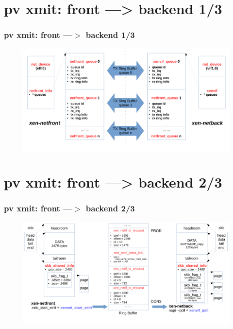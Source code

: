 \documentclass[aspectratio=169]{beamer}
\begin{document}

\section{pv xmit: front ---> backend 1/3}
\begin{frame}
\frametitle{pv xmit: front ---$>$ backend 1/3}
\begin{figure}
\includegraphics[width=1.0\linewidth]{figures/eth_to_vif.pdf}
\end{figure}
\end{frame}


\section{pv xmit: front ---> backend 2/3}
\begin{frame}
\frametitle{pv xmit: front ---$>$ backend 2/3}
\begin{figure}
\includegraphics[width=1.0\linewidth]{figures/xmit_skb.pdf}
\end{figure}
\end{frame}
\end{document}
